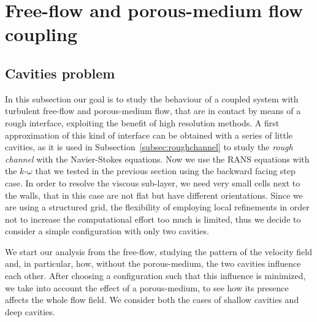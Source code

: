 \section{Free-flow and porous-medium flow coupling}
\subsection{Cavities problem}
In this subsection our goal is to study the behaviour of a coupled system with turbulent free-flow and 
porous-medium flow, that are in contact by means of a rough interface, exploiting the benefit of high resolution methods. A first approximation of this kind of interface can be obtained with a series of little
cavities, as it is used in Subsection~\ref{subsec:roughchannel} to study the \emph{rough channel} with the 
Navier-Stokes equations. Now we use the RANS equations with the 
$k\text{-}\omega$ that we tested in the previous section using the backward 
facing step case.
%
In order to resolve the viscous sub-layer, we need very small cells next to the walls, that in this case are not flat but have different orientations. Since we are using a structured grid, the flexibility of employing local refinements in order not to increase the computational effort too much is limited, thus we decide to consider a simple configuration with only two cavities.

We start our analysis from the free-flow, studying the pattern of the velocity 
field and, in particular, how, without the porous-medium, the two cavities 
influence each other.
After choosing a configuration such that this influence is minimized, we take 
into account the effect of a porous-medium, to see how its presence affects the 
whole flow field. We consider both the cases of shallow cavities and deep cavities.
%
